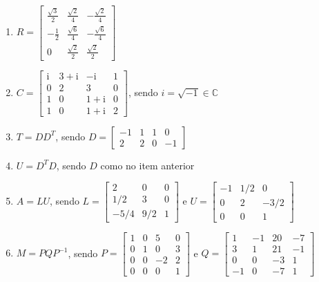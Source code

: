 \documentclass[12pt,a4paper]{article}
\newcommand\ii{\mathrm{i}}
\newcommand*\C{\mathbb{C}}
\begin{document}
\begin{enumerate}
\begin{enumerate}
\item $R = \begin{bmatrix}
\frac{\sqrt{3}}{2} & \frac{\sqrt{2}}{4} & -\frac{\sqrt{2}}{4} \\
-\frac{1}{2} & \frac{\sqrt{6}}{4} & -\frac{\sqrt{6}}{4} \\
0 & \frac{\sqrt{2}}{2} & \frac{\sqrt{2}}{2}
\end{bmatrix}$

\item $C =
\begin{bmatrix}
\ii & 3 + \ii & -\ii & 1\\
0 & 2 & 3 & 0\\
1 & 0 & 1+\ii & 0\\
1 & 0 & 1+\ii & 2
\end{bmatrix}$, sendo $i = \sqrt{-1} \in \C$

\item $T = D D^{T}$, sendo $D = 
\begin{bmatrix}
-1 & 1 & 1 &  0 \\
 2 & 2 & 0 & -1
\end{bmatrix}$

\item $U = D^{T} D$, sendo $D$ como no item anterior

\item $A = L U$, sendo $L =
\begin{bmatrix}
2 & 0 & 0 \\
1/2 & 3 & 0 \\
-5/4 & 9/2 & 1
\end{bmatrix}$ e $U = \begin{bmatrix}
-1 & 1/2 & 0 \\
 0 & 2 & -3/2 \\
 0 & 0 & 1
\end{bmatrix}$

\item $M = P Q P^{-1}$, sendo $P =
\begin{bmatrix}
   1 &  0 &  5 &  0\\
   0 &  1 &  0 &  3\\
   0 &  0 & -2 &  2\\
   0 &  0 &  0 &  1
\end{bmatrix}$ e $Q =
\begin{bmatrix}
 1 & -1 & 20 & -7 \\
 3 &  1 & 21 & -1 \\
 0 &  0 & -3 &  1 \\
-1 &  0 & -7 &  1
\end{bmatrix}$
\end{enumerate}


\end{enumerate}
\end{document}
